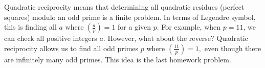 \documentclass{ximera}
\begin{document}
Quadratic reciprocity means that determining all quadratic residues (perfect squares) modulo an odd prime is a finite problem. In terms of Legendre symbol, this is finding all $a$ where $\left(\frac{a}{p}\right)=1$ for a given $p$. For example, when $p=11$, we can check all positive integers $a$. However, what about the reverse? Quadratic reciprocity allows us to find all odd primes $p$ where $\left(\frac{11}{p}\right)=1,$ even though there are infinitely many odd primes. This idea is the last homework problem.
\end{document}
